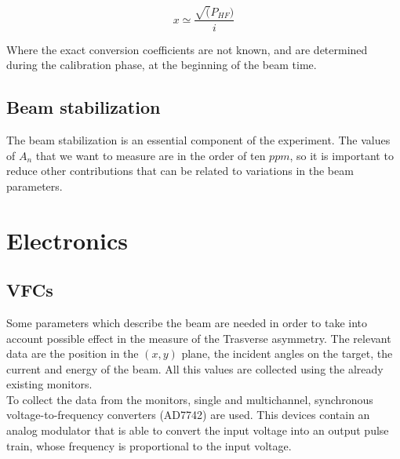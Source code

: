 \begin{equation} \label{eq:SignalToVfc}
x \simeq \frac{\sqrt(P_{HF})}{i}
\end{equation}

Where the exact conversion coefficients are not known, and are determined during the calibration phase, at the beginning of the beam time.

\subsection{Beam stabilization}

The beam stabilization is an essential component of the experiment. The values of $A_{n}$ that we want to measure are in the order of ten $ppm$, so it is important to reduce other contributions that can be related to variations in the beam parameters. 

\section{Electronics}


\subsection{VFCs}

Some parameters which describe the beam are needed in order to take into account possible effect in the measure of the Trasverse asymmetry. The relevant data are the position in the $(x,y)$ plane, the incident angles on the target, the current and energy of the beam. All this values are collected using the already existing monitors. \\
To collect the data from the monitors, single and multichannel, synchronous voltage-to-frequency converters (AD7742) are used. This devices contain an analog modulator that is able to convert the input voltage into an output pulse train, whose frequency is proportional to the input voltage. 

